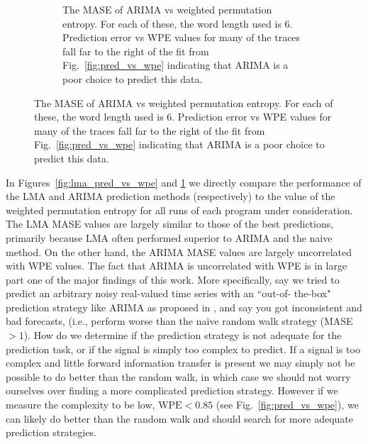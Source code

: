 \documentclass{article}
\begin{document}
\begin{figure}[htbp]
\begin{subfigure}[t]{0.5\textwidth}
    \caption{The MASE of ARIMA vs weighted permutation entropy. For each of
    these, the word length used is $6$. Prediction error vs WPE values for many
    of the traces fall far to the right of the fit from
    Fig.~\ref{fig:pred_vs_wpe} indicating that ARIMA is a poor choice to predict
    this data.}
    \label{fig:arima_pred_vs_wpe}
  \end{subfigure}
  \label{fig:predictions_vs_wpe}
\end{figure}


In Figures~\ref{fig:lma_pred_vs_wpe} and \ref{fig:arima_pred_vs_wpe} we directly
compare the performance of the LMA and ARIMA prediction methods (respectively)
to the value of the weighted permutation entropy for all runs of each program
under consideration. The LMA MASE values are largely similar to those of the
best predictions, primarily because LMA often performed superior to ARIMA and
the naive method. On the other hand, the ARIMA MASE values are largely
uncorrelated with WPE values. The fact that ARIMA is uncorrelated with WPE is in
large part one of the major findings of this work. More specifically, say we
tried to predict an arbitrary noisy real-valued time series with an ``out-of-
the-box" prediction strategy like ARIMA as proposed in \cite{ARIMA-autofit}, and
say you got inconsistent and bad forecasts, (i.e., perform worse than the
na\"ive random walk strategy (MASE$>1$). How do we determine if the prediction
strategy is not adequate for the prediction task, or if the signal is simply too
complex to predict. If a signal is too complex and little forward information
transfer is present we may simply not be possible to do better than the random
walk, in which case we should not worry ourselves over finding a more
complicated prediction strategy. However if we measure the complexity to be low,
$\textrm{WPE}<0.85$ (see Fig.~\ref{fig:pred_vs_wpe}), we can likely do better
than the random walk and should search for more adequate prediction strategies.
\end{document}
